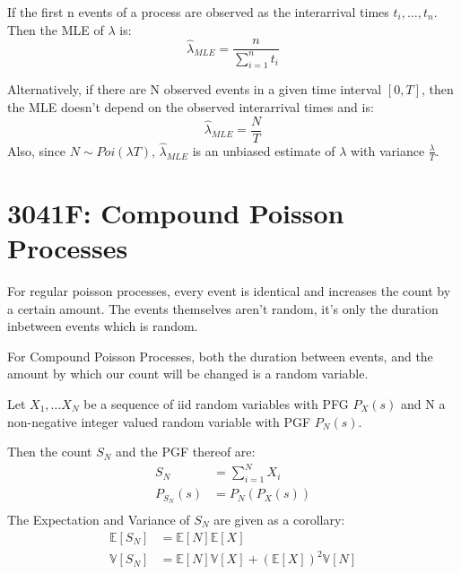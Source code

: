 \documentclass[12pt]{article}
\begin{document}
    If the first n events of a process are observed as the interarrival times \(t_i, \dots, t_n\). Then the MLE of \(\lambda\) is:
    \begin{equation*}
        \hat{\lambda}_{MLE} = \frac{n}{\sum_{i=1}^{n}t_i}
    \end{equation*}


    Alternatively, if there are N observed events in a given time interval \([0, T]\), then the MLE doesn't depend on the observed interarrival times and is:
    \begin{equation*}
        \hat{\lambda}_{MLE} = \frac{N}{T}
    \end{equation*}
    Also, since \(N \sim Poi(\lambda T)\), \(\hat{\lambda}_{MLE}\) is an unbiased estimate of 
    \(\lambda\) with variance \(\frac{\lambda}{T}\).
\section{3041F: Compound Poisson Processes}
    For regular poisson processes, every event is identical and increases the count by a 
    certain amount. The events themselves aren't random, it's only the duration inbetween
    events which is random.

    For Compound Poisson Processes, both the duration between events, and the amount by 
    which our count will be changed is a random variable.

    Let \(X_1, \dots X_N\) be a sequence of iid random variables with PFG \(P_X(s)\) and N a non-negative integer valued random variable with PGF \(P_N(s)\).

    Then the count \(S_N\) and the PGF thereof are:
    \begin{equation*}
        \begin{aligned}
            S_N &= \sum_{i=1}^{N} X_i \\
            P_{S_N}(s) &= P_N(P_X(s)) \\
        \end{aligned}
    \end{equation*}
    The Expectation and Variance of \(S_N\) are given as a corollary:
    \begin{equation*}
        \begin{aligned}
            \mathbb{E}[S_N] &= \mathbb{E}[N] \mathbb{E}[X]\\
            \mathbb{V}[S_N] &= \mathbb{E}[N]\mathbb{V}[X] + \left( \mathbb{E}[X]\right)^2 \mathbb{V}[N]\\
        \end{aligned}
    \end{equation*}
\end{document}
